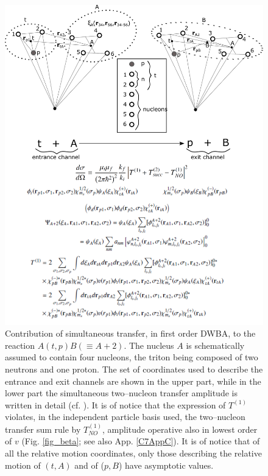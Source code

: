 \begin{figure}
\centerline{\includegraphics*[width=\textwidth,angle=0]{nutshell/figs/fig_alpha.pdf}}
\caption{Contribution of simultaneous transfer, in first order DWBA, to the reaction $A(t,p)B(\equiv A+2)$. The nucleus $A$ is schematically assumed to contain four nucleons, the triton being composed of two neutrons and one proton. The set of coordinates used to describe the entrance and exit channels are shown in the upper part, while in the lower part the simultaneous two--nucleon transfer amplitude is written in detail (cf. \cite{Potel:13b}). It is of notice that the expression of $T^{(1)}$ violates, in the independent particle basis used, the  two--nucleon transfer sum rule by  $T^{(1)}_{NO}$, amplitude operative also in lowest order of $v$ (Fig. \ref{fig_beta}; see also App. \ref{C7AppC}). It is of notice that of all the relative motion coordinates, only those describing the relative motion of $(t,A)$ and of ($p,B$) have asymptotic values.}\label{fig_alpha}
\end{figure}
